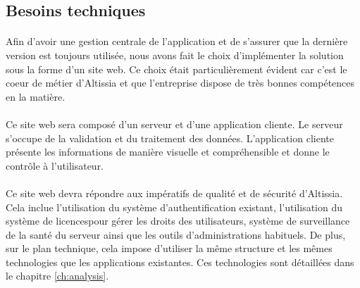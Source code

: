 \subsection{Besoins techniques}
\label{subsec:tech-needs}

\paragraph{}
Afin d'avoir une gestion centrale de l'application et de s'assurer que la dernière version est toujours utilisée, nous avons fait le choix d'implémenter la solution sous la forme d'un site web.
Ce choix était particulièrement évident car c'est le coeur de métier d'Altissia et que l'entreprise dispose de très bonnes compétences en la matière.

\paragraph{}
Ce site web sera composé d'un serveur et d'une application cliente.
Le serveur s'occupe de la validation et du traitement des données.
L'application cliente présente les informations de manière visuelle et compréhensible et donne le contrôle à l'utilisateur.

\paragraph{}
Ce site web devra répondre aux impératifs de qualité et de sécurité d'Altissia.
Cela inclue l'utilisation du système d'authentification existant, l'utilisation du système de licences\fnmark pour gérer les droits des utilisateurs, système de surveillance de la santé du serveur ainsi que les outils d'administrations habituels. %
De plus, sur le plan technique, cela impose d'utiliser la même structure et les mêmes technologies que les applications existantes.
Ces technologies sont détaillées dans le chapitre \ref{ch:analysis}.
